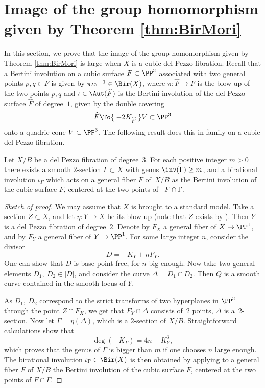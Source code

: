 \section{Image of the group homomorphism given by Theorem \ref{thm:BirMori}}\label{sec: image}

In this section, we prove that the image of the group homomorphism given by Theorem \ref{thm:BirMori} is large when $X$ is a cubic del Pezzo fibration. Recall that a Bertini involution on a cubic surface $F\subset \PP^3$ associated with two general points $p,q\in F$ is given by $\pi\iota\pi^{-1}\in \Bir(X)$, where $\pi\colon \widehat{F}\to F$ is the blow-up of the two points $p,q$ and $\iota\in \Aut(\widehat{F})$ is the Bertini involution of the del Pezzo surface $\widehat{F}$ of degree~$1$, given by the double covering
\[
\widehat{F}\To{\lvert -2K_{\widehat F}\rvert}V\subset \PP^3
\]
onto a quadric cone $V\subset \PP^3$. The following result does this in family on a cubic del Pezzo fibration.

\begin{prop}\label{prop: genus is unbounded}
Let $X/B$ be a del Pezzo fibration of degree~$3$. For each positive integer $m>0$ there exists a smooth $2$-section $\Gamma\subset X$ with genus $\inv(\Gamma)\ge m$, and a birational involution $\iota_\Gamma$ which acts on a general fiber $F$ of~$X/B$ as the Bertini involution of the cubic surface $F$, centered at the two points of ~$F\cap\nobreak \Gamma$.
\end{prop}
\begin{proof}[Sketch of proof]
We may assume that $X$ is brought to a standard model. Take a section $Z\subset X$, and let $\eta: Y\to X$ be its blow-up (note that $Z$ exists by \cite[IV, Th.\,6.8]{Kollar_rational}). Then $Y$ is a del Pezzo fibration of degree~$2$. Denote by $F_X$ a general fiber of $X\to\PP^1$, and by $F_Y$ a general fiber of $Y\to\PP^1$. For some large integer $n$, consider the divisor
\[
D=-K_Y+nF_Y.
\]
One can show that $D$ is base-point-free, for $n$ big enough. Now take two general elements $D_1,\ D_2\in |D|$, and consider the curve $\Delta=D_1\cap D_2$. Then $Q$ is a smooth curve contained in the smooth locus of $Y$.

As $D_1,\ D_2$ correspond to the strict transforms of two hyperplanes in $\PP^3$ through the point $Z\cap F_X$, we get that $F_Y\cap\Delta$ consists of~$2$ points, \ie $\Delta$ is a~$2$-section. Now let $\Gamma=\eta(\Delta)$, which is a $2$-section of $X/B$. Straightforward calculations show that
\[
\deg(-K_\Gamma)=4n-K_Y^3,
\]
which proves that the genus of $\Gamma$ is bigger than $m$ if one chooses $n$ large enough. The birational involution $\iota_\Gamma\in \Bir(X)$ is then obtained by applying to a general fiber $F$ of $X/B$ the Bertini involution of the cubic surface $F$, centered at the two points of $F\cap \Gamma$.
\end{proof}

